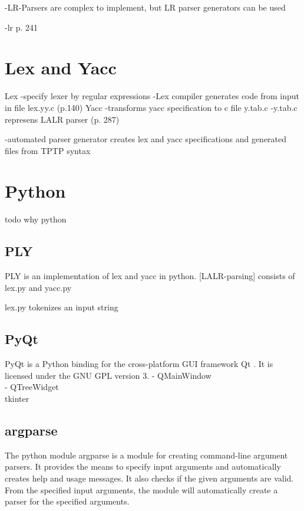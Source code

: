 -LR-Parsers are complex to implement, but LR parser generators can be used

\cite{Aho.2007}
-lr p. 241 

\section{Lex and Yacc}\label{sec:BackgroundLexYacc}
Lex
-specify lexer by regular expressions
-Lex compiler generates code from input in file lex.yy.c
(p.140)
Yacc
-transforms yacc specification to c file y.tab.c
-y.tab.c represens LALR parser
(p. 287)
\cite{Aho.2007}

-automated parser generator creates lex and yacc specifications and generated files from \ac{TPTP} syntax
\section{Python}\label{sec:BackgroundPython}
todo why python

\subsection{PLY}\label{sec:BackgroundPythonPLY}

\acf{PLY} \cite{PLY} is an implementation of lex and yacc in python.
[LALR-parsing]
consists of lex.py and yacc.py

lex.py tokenizes an input string\
\subsection{PyQt}\label{sec:BackgroundPytonPyQt}
PyQt is a Python binding for the cross-platform GUI framework Qt \cite{PyQt}.
It is licensed under the GNU GPL version 3.
- QMainWindow \\
- QTreeWidget \\


tkinter
\subsection{argparse}\label{sec:BackgroundArgparse}
The python module argparse \cite{argparse} is a module for creating command-line argument parsers.
It provides the means to specify input arguments and automatically creates help and usage messages.
It also checks if the given arguments are valid.
From the specified input arguments, the module will automatically create a parser for the specified arguments.